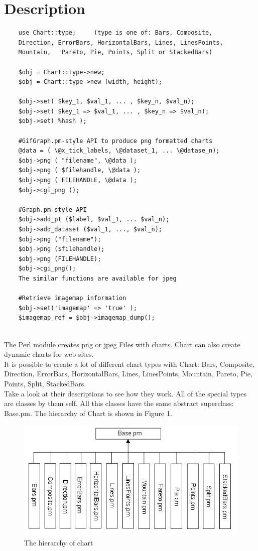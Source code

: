 \section{Description}
\begin{verbatim}
	use Chart::type;     (type is one of: Bars, Composite,
	Direction, ErrorBars, HorizontalBars, Lines, LinesPoints,
	Mountain,	Pareto, Pie, Points, Split or StackedBars)
		
	$obj = Chart::type->new;
	$obj = Chart::type->new (width, height);
	
	$obj->set( $key_1, $val_1, ... , $key_n, $val_n);
	$obj->set( $key_1 => $val_1, ... , $key_n => $val_n);
	$obj->set( %hash );
	
	#GifGraph.pm-style API to produce png formatted charts
	@data = ( \@x_tick_labels, \@dataset_1, ... \@datase_n);
	$obj->png ( "filename", \@data );
	$obj->png ( $filehandle, \@data );
	$obj->png ( FILEHANDLE, \@data );
	$obj->cgi_png ();
	
	#Graph.pm-style API
	$obj->add_pt ($label, $val_1, ... $val_n);
	$obj->add_dataset ($val_1, ..., $val_n);
	$obj->png ("filename");
	$obj->png ($filehandle);
	$obj->png (FILEHANDLE);
	$obj->cgi_png();
	The similar functions are available for jpeg	
	
	#Retrieve imagemap information
	$obj->set('imagemap' => 'true' );
	$imagemap_ref = $obj->imagemap_dump();
	
\end{verbatim}
\clearpage
The Perl module  creates png or jpeg Files with charts. Chart can also create dynamic charts for web sites.\\
It is possible to create a lot of different chart types with Chart: Bars, Composite, Direction, ErrorBars, HorizontalBars, Lines, LinesPoints, Mountain, Pareto, Pie, Points, Split, StackedBars.\\
Take a look at their descriptions to see how they work. All of the special types are classes by them self. All this classes have the same abstract superclass: Base.pm. The hierarchy of Chart is shown in Figure 1.      
\begin{figure}[h]
	\begin{center}
		\includegraphics[scale=0.5]{Aufbau.png}
	\end{center}
	\caption{The hierarchy of chart}
	\label{fig:Aufbau}
\end{figure}
